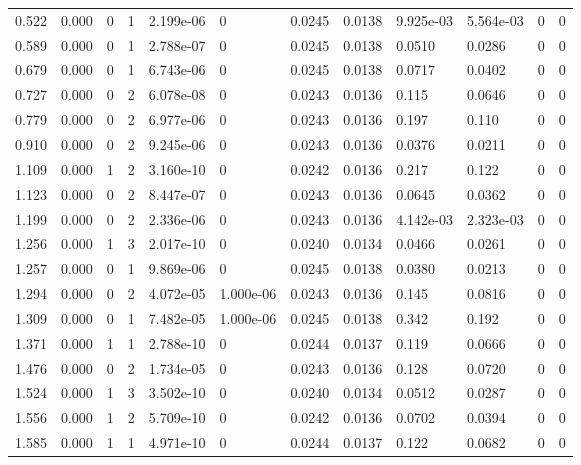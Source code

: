 \documentclass[preview]{standalone}
\begin{document}
{{\begin{tabular}{L{1.2cm}C{1.2cm} C{0.3cm}C{0.5cm} C{1.4cm}C{1.4cm} C{1.4cm}C{1.4cm} C{1.6cm}C{1.6cm} C{1.6cm}C{1.6cm}}
  0.522  &  0.000  & 0     &  1 &  2.199e-06  & 0  &  0.0245&   0.0138& 9.925e-03 & 5.564e-03   &  0 & 0  \\ 
  0.589  &  0.000  & 0     &  1 &  2.788e-07  & 0  &  0.0245&   0.0138& 0.0510 & 0.0286   &  0 & 0  \\ 
  0.679  &  0.000  & 0     &  1 &  6.743e-06  & 0  &  0.0245&   0.0138& 0.0717 & 0.0402   &  0 & 0  \\ 
  0.727  &  0.000  & 0     &  2 &  6.078e-08  & 0  &  0.0243&   0.0136& 0.115 & 0.0646   &  0 & 0  \\ 
  0.779  &  0.000  & 0     &  2 &  6.977e-06  & 0  &  0.0243&   0.0136& 0.197 & 0.110   &  0 & 0  \\ 
  0.910  &  0.000  & 0     &  2 &  9.245e-06  & 0  &  0.0243&   0.0136& 0.0376 & 0.0211   &  0 & 0  \\ 
  1.109  &  0.000  & 1     &  2 &  3.160e-10  & 0  &  0.0242&   0.0136& 0.217 & 0.122   &  0 & 0  \\ 
  1.123  &  0.000  & 0     &  2 &  8.447e-07  & 0  &  0.0243&   0.0136& 0.0645 & 0.0362   &  0 & 0  \\ 
  1.199  &  0.000  & 0     &  2 &  2.336e-06  & 0  &  0.0243&   0.0136& 4.142e-03 & 2.323e-03   &  0 & 0  \\ 
  1.256  &  0.000  & 1     &  3 &  2.017e-10  & 0  &  0.0240&   0.0134& 0.0466 & 0.0261   &  0 & 0  \\ 
  1.257  &  0.000  & 0     &  1 &  9.869e-06  & 0  &  0.0245&   0.0138& 0.0380 & 0.0213   &  0 & 0  \\ 
  1.294  &  0.000  & 0     &  2 &  4.072e-05  & 1.000e-06  &  0.0243&   0.0136& 0.145 & 0.0816   &  0 & 0  \\ 
  1.309  &  0.000  & 0     &  1 &  7.482e-05  & 1.000e-06  &  0.0245&   0.0138& 0.342 & 0.192   &  0 & 0  \\ 
  1.371  &  0.000  & 1     &  1 &  2.788e-10  & 0  &  0.0244&   0.0137& 0.119 & 0.0666   &  0 & 0  \\ 
  1.476  &  0.000  & 0     &  2 &  1.734e-05  & 0  &  0.0243&   0.0136& 0.128 & 0.0720   &  0 & 0  \\ 
  1.524  &  0.000  & 1     &  3 &  3.502e-10  & 0  &  0.0240&   0.0134& 0.0512 & 0.0287   &  0 & 0  \\ 
  1.556  &  0.000  & 1     &  2 &  5.709e-10  & 0  &  0.0242&   0.0136& 0.0702 & 0.0394   &  0 & 0  \\ 
  1.585  &  0.000  & 1     &  1 &  4.971e-10  & 0  &  0.0244&   0.0137& 0.122 & 0.0682   &  0 & 0  \\ 

\end{tabular}}}
\end{document}
